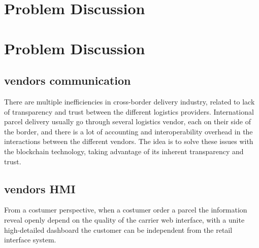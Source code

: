 \section{Problem Discussion}

\section{Problem Discussion}

\subsection{vendors communication}
There are multiple inefficiencies in cross-border delivery industry, related to lack of transparency and trust between the different logistics providers. International parcel delivery usually go through several logistics vendor, each on their side of the border, and there is a lot of accounting and interoperability overhead in the interactions between the different vendors. The idea is to solve these issues with the blockchain technology, taking advantage of its inherent transparency and trust.

\subsection{vendors HMI}
From a costumer perspective, when a costumer order a parcel the information reveal openly depend on the quality of the carrier web interface, with a unite high-detailed dashboard the customer can be independent from the retail interface system. 





